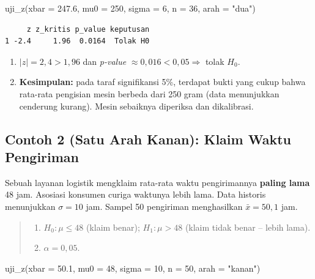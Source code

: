 \documentclass[
  indonesian,
  letterpaper,
]{book}
\newenvironment{Shaded}{\begin{snugshade}}{\end{snugshade}}
\newcommand{\AttributeTok}[1]{\textcolor[rgb]{0.40,0.45,0.13}{#1}}
\newcommand{\DecValTok}[1]{\textcolor[rgb]{0.68,0.00,0.00}{#1}}
\newcommand{\FloatTok}[1]{\textcolor[rgb]{0.68,0.00,0.00}{#1}}
\newcommand{\FunctionTok}[1]{\textcolor[rgb]{0.28,0.35,0.67}{#1}}
\newcommand{\NormalTok}[1]{\textcolor[rgb]{0.00,0.23,0.31}{#1}}
\newcommand{\StringTok}[1]{\textcolor[rgb]{0.13,0.47,0.30}{#1}}
\providecommand{\tightlist}{%
  \setlength{\itemsep}{0pt}\setlength{\parskip}{0pt}}
\begin{document}
\begin{Shaded}
\begin{Highlighting}[]
\FunctionTok{uji\_z}\NormalTok{(}\AttributeTok{xbar =} \FloatTok{247.6}\NormalTok{, }\AttributeTok{mu0 =} \DecValTok{250}\NormalTok{, }\AttributeTok{sigma =} \DecValTok{6}\NormalTok{, }\AttributeTok{n =} \DecValTok{36}\NormalTok{, }\AttributeTok{arah =} \StringTok{"dua"}\NormalTok{)}
\end{Highlighting}
\end{Shaded}

\begin{verbatim}
     z z_kritis p_value keputusan
1 -2.4     1.96  0.0164  Tolak H0
\end{verbatim}

\begin{enumerate}
\def\labelenumi{\arabic{enumi}.}
\setcounter{enumi}{3}
\item
  \(\lvert z \rvert = 2{,}4 > 1{,}96\) dan \emph{p-value}
  \(\approx 0{,}016 < 0{,}05 \Rightarrow\) tolak \(H_0\).
\item
  \textbf{Kesimpulan:} pada taraf signifikansi 5\%, terdapat bukti yang
  cukup bahwa rata-rata pengisian mesin berbeda dari 250 gram (data
  menunjukkan cenderung kurang). Mesin sebaiknya diperiksa dan
  dikalibrasi.
\end{enumerate}

\subsection{Contoh 2 (Satu Arah Kanan): Klaim Waktu
Pengiriman}\label{contoh-2-satu-arah-kanan-klaim-waktu-pengiriman}

Sebuah layanan logistik mengklaim rata-rata waktu pengirimannya
\textbf{paling lama} 48 jam. Asosiasi konsumen curiga waktunya lebih
lama. Data historis menunjukkan \(\sigma = 10\) jam. Sampel 50
pengiriman menghasilkan \(\bar{x} = 50{,}1\) jam.

\begin{quote}
\begin{enumerate}
\def\labelenumi{\arabic{enumi}.}
\tightlist
\item
  \(H_0: \mu \le 48\) (klaim benar); \(H_1: \mu > 48\) (klaim tidak
  benar -- lebih lama).
\item
  \(\alpha = 0{,}05\).
\end{enumerate}
\end{quote}

\begin{Shaded}
\begin{Highlighting}[]
\FunctionTok{uji\_z}\NormalTok{(}\AttributeTok{xbar =} \FloatTok{50.1}\NormalTok{, }\AttributeTok{mu0 =} \DecValTok{48}\NormalTok{, }\AttributeTok{sigma =} \DecValTok{10}\NormalTok{, }\AttributeTok{n =} \DecValTok{50}\NormalTok{, }\AttributeTok{arah =} \StringTok{"kanan"}\NormalTok{)}
\end{Highlighting}
\end{Shaded}
\end{document}
